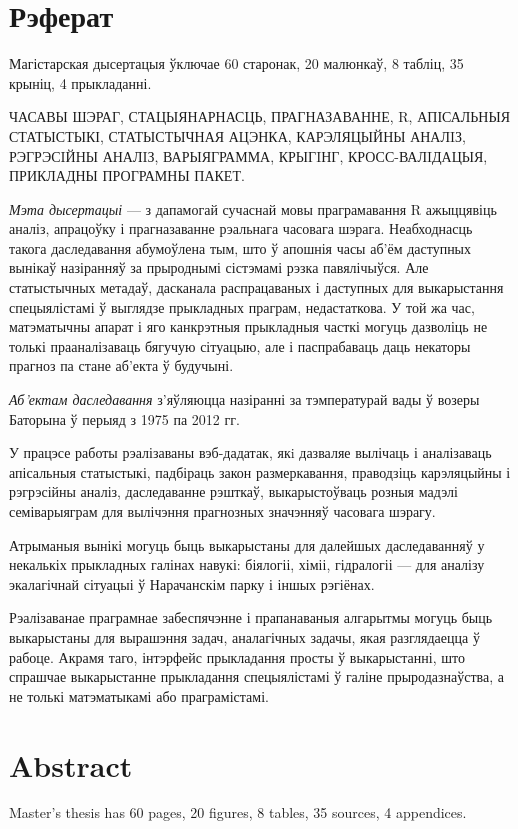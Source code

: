 \documentclass[a4paper,14pt]{extreport}
\begin{document}
\newpage

\chapter*{Рэферат}
Магістарская дысертацыя ўключае 60 старонак, 20 малюнкаў, 8 табліц, 35 крыніц, 4 прыкладанні.

ЧАСАВЫ ШЭРАГ, СТАЦЫЯНАРНАСЦЬ, ПРАГНАЗАВАННЕ, R, АПІСАЛЬНЫЯ СТАТЫСТЫКІ, СТАТЫСТЫЧНАЯ АЦЭНКА, КАРЭЛЯЦЫЙНЫ АНАЛIЗ, РЭГРЭСIЙНЫ АНАЛIЗ, ВАРЫЯГРАММА, КРЫГIНГ, КРОСС-ВАЛIДАЦЫЯ, ПРИКЛАДНЫ ПРОГРАМНЫ ПАКЕТ\@.

\textit{Мэта дысертацыі} --- з дапамогай сучаснай мовы праграмавання R ажыццявіць аналіз, апрацоўку і прагназаванне рэальнага часовага шэрага. Неабходнасць такога даследавання абумоўлена тым, што ў апошнія часы аб'ём даступных вынікаў назіранняў за прыроднымі сістэмамі рэзка павялічыўся. Але статыстычных метадаў, дасканала распрацаваных і даступных для выкарыстання спецыялістамі ў выглядзе прыкладных праграм, недастаткова. У той жа час, матэматычны апарат і яго канкрэтныя прыкладныя часткі могуць дазволіць не толькі прааналізаваць бягучую сітуацыю, але і паспрабаваць даць некаторы прагноз па стане аб'екта ў будучыні.

\textit{Аб'ектам даследавання} з'яўляюцца назіранні за тэмпературай вады ў возеры Баторына ў перыяд з 1975 па 2012 гг.

У працэсе работы рэалізаваны вэб-дадатак, якi дазваляе вылічаць і аналізаваць апісальныя статыстыкі, падбіраць закон размеркавання, праводзіць карэляцыйны і рэгрэсійны аналіз, даследаванне рэшткаў, выкарыстоўваць розныя мадэлі семіварыяграм для вылічэння прагнозных значэнняў часовага шэрагу.

Атрыманыя вынікі могуць быць выкарыстаны для далейшых даследаванняў у некалькіх прыкладных галінах навукі: біялогіі, хіміі, гідралогіі --- для аналізу экалагічнай сітуацыі ў Нарачанскім парку і іншых рэгіёнах.

Рэалізаванае праграмнае забеспячэнне і прапанаваныя алгарытмы могуць быць выкарыстаны для вырашэння задач, аналагічных задачы, якая разглядаецца ў рабоце. Акрамя таго, інтэрфейс прыкладання просты ў выкарыстанні, што спрашчае выкарыстанне прыкладання спецыялістамі ў галіне прыродазнаўства, а не толькі матэматыкамі або праграмістамі.
\newpage

\chapter*{Abstract}
Master's thesis has 60 pages, 20 figures, 8 tables, 35 sources, 4 appendices.
\end{document}
